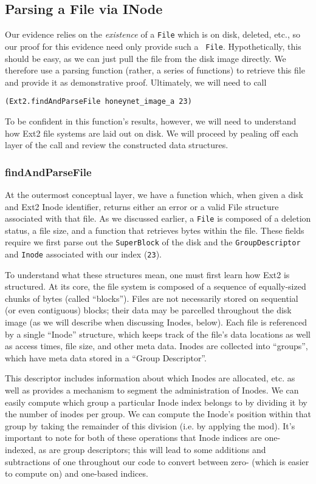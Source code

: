 \documentclass[nocopyrightspace]{sigplanconf}
\begin{document}
\subsection{Parsing a File via INode}

Our evidence relies on the {\it existence} of a {\tt File} which is on disk,
deleted, etc., so our proof for this evidence need only provide such a {\tt
File}. Hypothetically, this should be easy, as we can just pull the file from
the disk image directly. We therefore use a parsing function (rather, a series
of functions) to retrieve this file and provide it as demonstrative proof.
Ultimately, we will need to call

\begin{lstlisting}
(Ext2.findAndParseFile honeynet_image_a 23)
\end{lstlisting}

To be confident in this function's results, however, we will need to
understand how Ext2 file systems are laid out on disk. We will proceed by
pealing off each layer of the call and review the constructed data structures.

\subsubsection{findAndParseFile}

At the outermost conceptual layer, we have a function which, when given a disk
and Ext2 Inode identifier, returns either an error or a valid File structure
associated with that file. As we discussed earlier, a {\tt File} is composed
of a deletion status, a file size, and a function that retrieves bytes within
the file. These fields require we first parse out the {\tt SuperBlock} of the
disk and the {\tt GroupDescriptor} and {\tt Inode} associated with our index
({\tt 23}).

To understand what these structures mean, one must first learn how Ext2 is
structured. At its core, the file system is composed of a sequence of
equally-sized chunks of bytes (called ``blocks''). Files are not necessarily
stored on sequential (or even contiguous) blocks; their data may be parcelled
throughout the disk image (as we will describe when discussing Inodes, below).
Each file is referenced by a single ``Inode'' structure, which keeps track of
the file's data locations as well as access times, file size, and other meta
data. Inodes are collected into ``groups'', which have meta data stored in a
``Group Descriptor''. 

This descriptor includes information about which Inodes are allocated, etc. as
well as provides a mechanism to segment the administration of Inodes. We can
easily compute which group a particular Inode index belongs to by dividing it
by the number of inodes per group. We can compute the Inode's position within
that group by taking the remainder of this division (i.e. by applying the
mod). It's important to note for both of these operations that Inode indices
are one-indexed, as are group descriptors; this will lead to some additions
and subtractions of one throughout our code to convert between zero- (which is
easier to compute on) and one-based indices.
\end{document}
